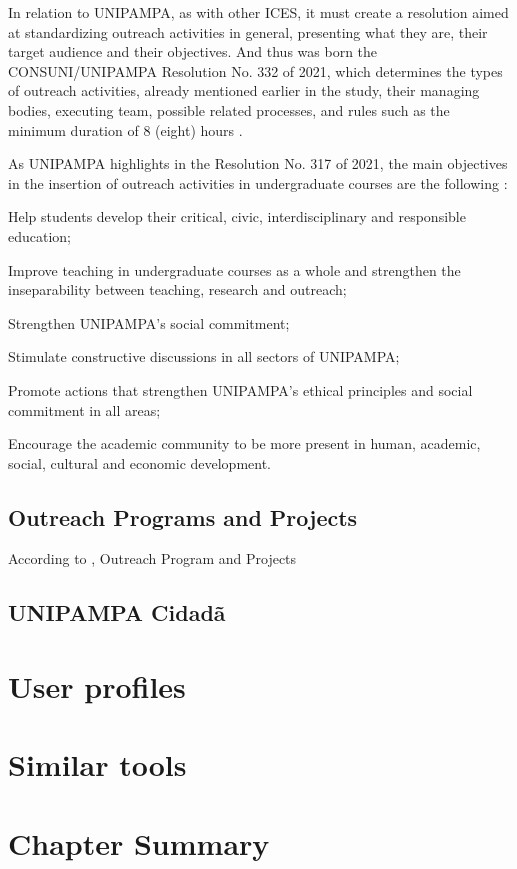 In relation to \ac{UNIPAMPA}, as with other \ac{ICES}, it must create a resolution aimed at standardizing outreach activities in general, presenting what they are, their target audience and their objectives. And thus was born the CONSUNI/UNIPAMPA Resolution No. 332 of 2021, which determines the types of outreach activities, already mentioned earlier in the study, their managing bodies, executing team, possible related processes, and rules such as the minimum duration of 8 (eight) hours \cite{Resolucao-332:2021}.

As \ac{UNIPAMPA} highlights in the Resolution No. 317 of 2021, the main objectives in the insertion of outreach activities in undergraduate courses are the following \cite{res317}:
\begin{inparaenum}[(i)]
  \item Help students develop their critical, civic, interdisciplinary and responsible education;
  \item Improve teaching in undergraduate courses as a whole and strengthen the inseparability between teaching, research and outreach;
  \item Strengthen \ac{UNIPAMPA}'s social commitment;
  \item Stimulate constructive discussions in all sectors of \ac{UNIPAMPA};
  \item Promote actions that strengthen \ac{UNIPAMPA}'s ethical principles and social commitment in all areas;
  \item Encourage the academic community to be more present in human, academic, social, cultural and economic development.
\end{inparaenum}

\subsection{Outreach Programs and Projects}\label{sec:bac-3}

According to , Outreach Program and Projects

\subsection{UNIPAMPA Cidadã}\label{sec:bac-4}

\section{User profiles}\label{sec:bac-5}

\section{Similar tools}\label{sec:bac-6}

\section{Chapter Summary}\label{sec:bac-7}